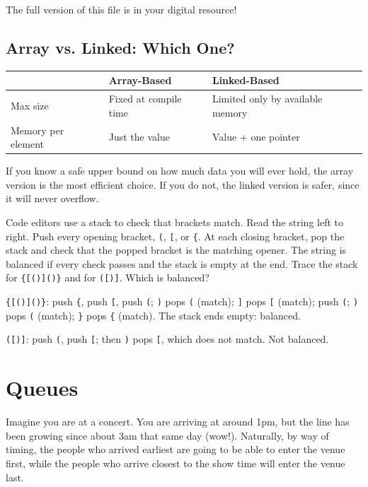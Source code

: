 The full version of this file is in your digital resource!

\subsection{Array vs. Linked: Which One?}

\begin{center}
\begin{tabular}{|l|l|l|}
\hline
 & \textbf{Array-Based} & \textbf{Linked-Based} \\
\hline
Max size & Fixed at compile time & Limited only by available memory \\
\hline
Memory per element & Just the value & Value + one pointer \\
\hline
\end{tabular}
\end{center}

If you know a safe upper bound on how much data you will ever hold, the array version is the most efficient choice. If you do not, the linked version is safer, since it will never overflow.


\begin{Exercise}[title={Balanced Brackets}, label=stack_brackets]
Code editors use a stack to check that brackets match. Read the string left
to right. Push every opening bracket, \texttt{(}, \texttt{[}, or
\texttt{\{}. At each closing bracket, pop the stack and check that the
popped bracket is the matching opener. The string is balanced if every
check passes and the stack is empty at the end. Trace the stack for
\texttt{\{[()]()\}} and for \texttt{([)]}. Which is balanced?
\end{Exercise}
\begin{Answer}[ref=stack_brackets]
\texttt{\{[()]()\}}: push \texttt{\{}, push \texttt{[}, push \texttt{(};
\texttt{)} pops \texttt{(} (match); \texttt{]} pops \texttt{[} (match);
push \texttt{(}; \texttt{)} pops \texttt{(} (match); \texttt{\}} pops
\texttt{\{} (match). The stack ends empty: balanced.

\texttt{([)]}: push \texttt{(}, push \texttt{[}; then \texttt{)} pops
\texttt{[}, which does not match. Not balanced.
\end{Answer}

\section{Queues}

Imagine you are at a concert. You are arriving at around 1pm, but the line has been growing since about 3am that same day (wow!). Naturally, by way of timing, the people who arrived earliest are going to be able to enter the venue first, while the people who arrive closest to the show time will enter the venue last.

